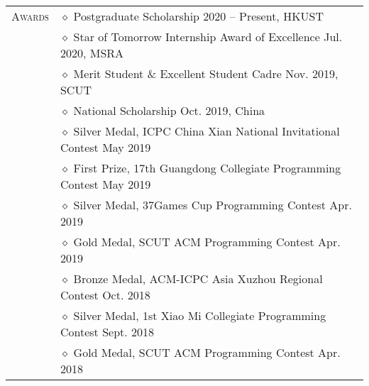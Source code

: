 \documentclass[letterpaper, 10pt]{article}
\begin{document}
\begin{longtable}{p{0.7in}p{6.0in}}
\nohyphens{\textsc{Awards}}
& $\diamond$ Postgraduate Scholarship \hfill 2020 -- Present, HKUST \\
& $\diamond$ Star of Tomorrow Internship Award of Excellence \hfill Jul. 2020, MSRA \\

& $\diamond$ Merit Student \& Excellent Student Cadre \hfill Nov. 2019, SCUT \\
& $\diamond$ National Scholarship \hfill Oct. 2019, China \\

& $\diamond$ Silver Medal, ICPC China Xian National Invitational Contest \hfill May 2019 \\

& $\diamond$ First Prize, 17th Guangdong Collegiate Programming Contest \hfill May 2019 \\

& $\diamond$ Silver Medal, 37Games Cup Programming Contest \hfill Apr. 2019 \\

& $\diamond$ Gold Medal, SCUT ACM Programming Contest \hfill Apr. 2019 \\

& $\diamond$ Bronze Medal, ACM-ICPC Asia Xuzhou Regional Contest \hfill Oct. 2018 \\

& $\diamond$ Silver Medal, 1st Xiao Mi Collegiate Programming Contest \hfill Sept. 2018 \\

& $\diamond$ Gold Medal, SCUT ACM Programming Contest \hfill Apr. 2018 \\


\end{longtable}
\end{document}
